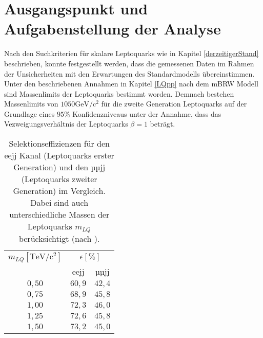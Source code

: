 \section{Ausgangspunkt und Aufgabenstellung der Analyse}\label{AusgangspunktProblemstellung}%
Nach den Suchkriterien für skalare Leptoquarks wie in Kapitel \ref{derzeitigerStand} beschrieben, konnte festgestellt werden, dass die gemessenen Daten im Rahmen der Unsicherheiten mit den Erwartungen des Standardmodells übereinstimmen. Unter den beschriebenen Annahmen in Kapitel \ref{LQpp} nach dem mBRW Modell sind Massenlimits der Leptoquarks bestimmt worden. Demnach bestehen Massenlimits von $1050\text{GeV}/\text{c}^2$ für die zweite Generation Leptoquarks auf der Grundlage eines $95$\% Konfidenzniveaus unter der Annahme, dass das Vezweigungsverhältnis der Leptoquarks $\beta=1$ beträgt. 
\begin{table}[htbp]
		\centering
		\begin{tabular*}{0.4\linewidth}{cc|c}
		\hline
		\hline
		\rule[7pt]{0pt}{23pt} $m_{LQ} [\text{TeV}/\text{c}^2]$ & \multicolumn{2}{c}{$\epsilon [\%]$}  
		\\
		\cline{2-3}
		\rule[-7pt]{0pt}{23pt} & eejj & µµjj
		\\
		\hline
		\rule[-6pt]{0pt}{21pt} $0{,}50$ & \(60{,}9\) & $42{,}4$ 
		\\
		\rule[-6pt]{0pt}{21pt}$0{,}75$&  \(68{,}9\)	& $45{,}8$ 
		\\
		\rule[-6pt]{0pt}{21pt} $1{,}00$ & \(72{,}3\) & $46{,}0$ 
		\\
		\rule[-6pt]{0pt}{21pt}$1{,}25$ &  \(72{,}6\)	& $45{,}8$ 
		\\
		\rule[-6pt]{0pt}{21pt} $1{,}50$ & \(73{,}2\) & $45{,}0$ 
		\\
		\hline
		\hline
		\end{tabular*}
		\caption[Selektionseffizienzen in den Kanälen eejj und µµjj für unterschiedliche Leptoquarmassen im Vergleich]{Selektionseffizienzen für den eejj Kanal (Leptoquarks erster Generation) und den µµjj (Leptoquarks zweiter Generation) im Vergleich. Dabei sind auch unterschiedliche Massen der Leptoquarks $m_{LQ}$ berücksichtigt (nach \cite{LQATLAS}).}
		\label{SelektionsEffPaper}
	\end{table}

